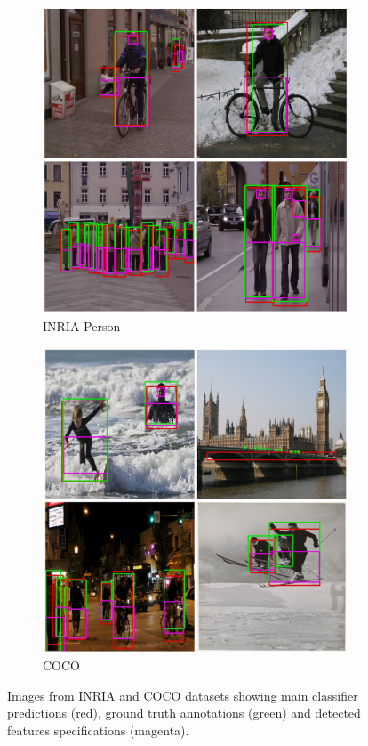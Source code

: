 \begin{figure}[h]
    \centering
    \begin{subfigure}{0.38\textwidth}
        \includegraphics[width=1\textwidth]{other/figures/INRIA_samples_v2.png}
        \caption{INRIA Person}
    \end{subfigure}
    \begin{subfigure}{0.38\textwidth}
        \includegraphics[width=1\textwidth]{other/figures/COCO_samples_v2.png}
        \caption{COCO}
    \end{subfigure}
    \caption{Images from INRIA and COCO datasets showing main classifier predictions (red), ground truth annotations (green) and detected features specifications (magenta).}
    \label{summary_pics}
\end{figure}

